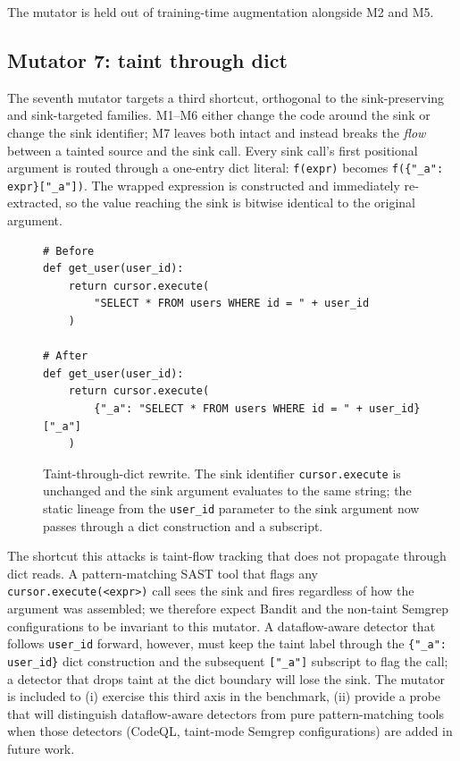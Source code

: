 The mutator is held out of training-time augmentation alongside M2
and M5.

\subsection{Mutator 7: taint through dict}
\label{sec:method:ttd}

The seventh mutator targets a third shortcut, orthogonal to the
sink-preserving and sink-targeted families. M1--M6 either change the
code around the sink or change the sink identifier; M7 leaves both
intact and instead breaks the \emph{flow} between a tainted source
and the sink call. Every sink call's first positional argument is
routed through a one-entry dict literal: \texttt{f(expr)} becomes
\texttt{f(\{"\_a": expr\}["\_a"])}. The wrapped expression is
constructed and immediately re-extracted, so the value reaching the
sink is bitwise identical to the original argument.

\begin{figure}[h]
\begin{verbatim}
# Before
def get_user(user_id):
    return cursor.execute(
        "SELECT * FROM users WHERE id = " + user_id
    )

# After
def get_user(user_id):
    return cursor.execute(
        {"_a": "SELECT * FROM users WHERE id = " + user_id}["_a"]
    )
\end{verbatim}
\caption{Taint-through-dict rewrite. The sink identifier
\texttt{cursor.execute} is unchanged and the sink argument
evaluates to the same string; the static lineage from the
\texttt{user\_id} parameter to the sink argument now passes
through a dict construction and a subscript.}
\label{lst:ttd}
\end{figure}

The shortcut this attacks is taint-flow tracking that does not
propagate through dict reads. A pattern-matching SAST tool that
flags any \texttt{cursor.execute(<expr>)} call sees the sink and
fires regardless of how the argument was assembled; we therefore
expect Bandit and the non-taint Semgrep configurations to be
invariant to this mutator. A dataflow-aware detector that follows
\texttt{user\_id} forward, however, must keep the taint label
through the \texttt{\{"\_a": user\_id\}} dict construction and
the subsequent \texttt{["\_a"]} subscript to flag the call; a
detector that drops taint at the dict boundary will lose the
sink. The mutator is included to (i) exercise this third axis in
the benchmark, (ii) provide a probe that will distinguish
dataflow-aware detectors from pure pattern-matching tools when
those detectors (CodeQL, taint-mode Semgrep configurations) are
added in future work.

